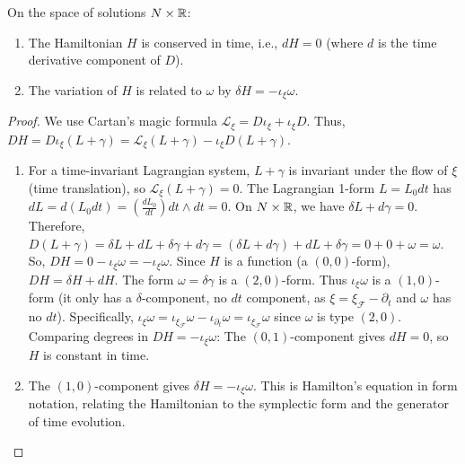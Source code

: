 \begin{lemma}
\label{lemma:properties_hamiltonian}
On the space of solutions $N \times \mathbb{R}$:
\begin{enumerate}
    \item The Hamiltonian $H$ is conserved in time, i.e., $dH = 0$ (where $d$ is the time derivative component of $D$).
    \item The variation of $H$ is related to $\omega$ by $\delta H = -\iota_{\xi}\omega$.
\end{enumerate}
\end{lemma}
\begin{proof}
We use Cartan's magic formula $\mathcal{L}_{\xi} = D\iota_{\xi} + \iota_{\xi}D$.
Thus, $D H = D \iota_{\xi}(L+\gamma) = \mathcal{L}_{\xi}(L+\gamma) - \iota_{\xi}D(L+\gamma)$.
\begin{enumerate}
    \item For a time-invariant Lagrangian system, $L+\gamma$ is invariant under the flow of $\xi$ (time translation), so $\mathcal{L}_{\xi}(L+\gamma) = 0$.
    The Lagrangian 1-form $L=L_0 dt$ has $dL = d(L_0 dt) = (\frac{d L_0}{dt}) dt \wedge dt = 0$.
    On $N \times \mathbb{R}$, we have $\delta L + d\gamma = 0$.
    Therefore, $D(L+\gamma) = \delta L + dL + \delta\gamma + d\gamma = (\delta L+d\gamma) + dL + \delta\gamma = 0 + 0 + \omega = \omega$.
    So, $D H = 0 - \iota_{\xi}\omega = -\iota_{\xi}\omega$.
    Since $H$ is a function (a $(0,0)$-form), $DH = \delta H + dH$.
    The form $\omega = \delta\gamma$ is a $(2,0)$-form. Thus $\iota_{\xi}\omega$ is a $(1,0)$-form (it only has a $\delta$-component, no $dt$ component, as $\xi = \xi_{\mathcal{F}} - \partial_t$ and $\omega$ has no $dt$).
    Specifically, $\iota_{\xi}\omega = \iota_{\xi_{\mathcal{F}}}\omega - \iota_{\partial_t}\omega = \iota_{\xi_{\mathcal{F}}}\omega$ since $\omega$ is type $(2,0)$.
    Comparing degrees in $DH = -\iota_{\xi}\omega$:
    The $(0,1)$-component gives $dH = 0$, so $H$ is constant in time.

    \item The $(1,0)$-component gives $\delta H = -\iota_{\xi}\omega$. This is Hamilton's equation in form notation, relating the Hamiltonian to the symplectic form and the generator of time evolution.
\end{enumerate}
\end{proof}

